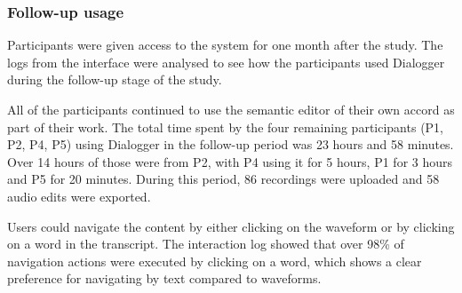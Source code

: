 \subsubsection{Follow-up usage}
Participants were given access to the system for one month after the study.  The logs from the interface were analysed
to see how the participants used Dialogger during the follow-up stage of the study.

All of the participants continued to use the semantic editor of their own accord as part of their work. The total time
spent by the four remaining participants (P1, P2, P4, P5) using Dialogger in the follow-up period was 23 hours and 58
minutes.  Over 14 hours of those were from P2, with P4 using it for 5 hours, P1 for 3 hours and P5 for 20 minutes.
During this period, 86 recordings were uploaded and 58 audio edits were exported.


Users could navigate the content by either clicking on the waveform or by clicking on a word in the transcript. The
interaction log showed that over 98\% of navigation actions were executed by clicking on a word, which shows a clear
preference for navigating by text compared to waveforms.



